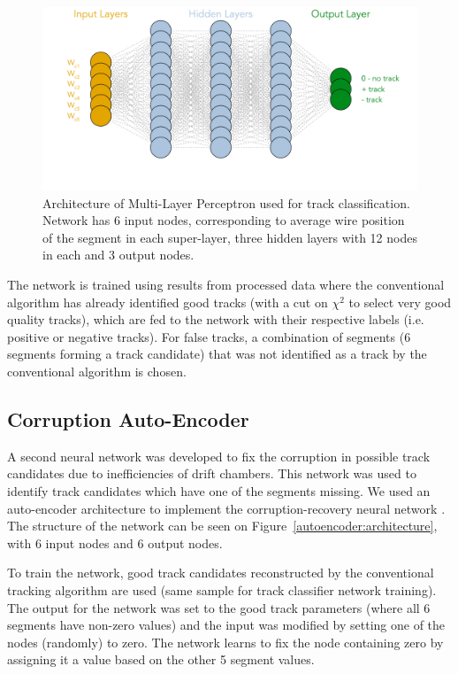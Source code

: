  \begin{figure}[!ht]
\begin{center}
  \includegraphics[width=4.5in]{images/mlp_diagram.pdf}
\caption {Architecture of Multi-Layer Perceptron used for track classification. Network has 6 input nodes, corresponding to average wire position of the segment in each super-layer, three hidden layers with 12 nodes in each and 3 output nodes.}
 \label{mlp:architecture}
 \end{center}
\end{figure}

The network is trained using results from processed data where the conventional algorithm has already 
identified good tracks (with a cut on $\chi^2$ to select very good quality tracks), which are fed to the network with
their respective labels (i.e. positive or negative tracks). For false tracks, a combination 
of segments (6 segments forming a track candidate) that was not identified as a track by the conventional algorithm is chosen.
 
 \subsection{Corruption Auto-Encoder}
 
A second neural network was developed to fix the corruption in possible track candidates due to 
inefficiencies of drift chambers. This network was used to identify track candidates which have one of the segments
missing. We used an auto-encoder architecture to implement the corruption-recovery neural network \cite{Gavalian:2020xmc}. 
The structure of the network can be seen on Figure~\ref{autoencoder:architecture}, with 6 input nodes and 6 output nodes.

To train the network, good track candidates reconstructed by the conventional tracking algorithm are used (same sample 
 for track classifier network training). The output for the network was set to the good track parameters (where all 6 
segments have non-zero values) and the input was modified by setting one of the nodes (randomly) to zero. The network
learns to fix the node containing zero by assigning it a value based on the other 5 segment values. 

